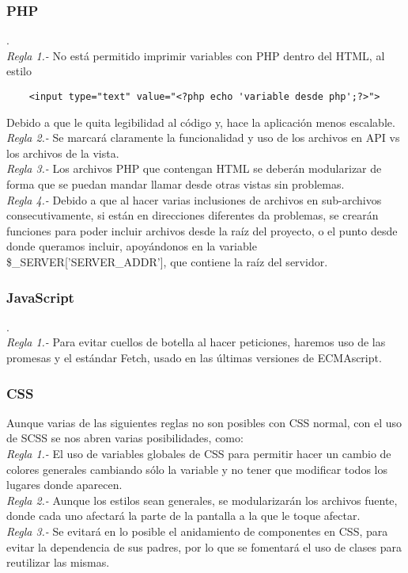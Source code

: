	\subsubsection{PHP}
	.\\
	\textit{Regla 1.-} No está permitido imprimir variables con PHP dentro del HTML, al estilo
	\begin{lstlisting}
	<input type="text" value="<?php echo 'variable desde php';?>">
	\end{lstlisting}
	Debido a que le quita legibilidad al código y, hace la aplicación menos escalable. \\
	\textit{Regla 2.-} Se marcará claramente la funcionalidad y uso de los archivos en API vs los archivos de la vista. \\
	\textit{Regla 3.-} Los archivos PHP que contengan HTML se deberán modularizar de forma que se puedan mandar llamar desde otras vistas sin problemas. \\
	\textit{Regla 4.-} Debido a que al hacer varias inclusiones de archivos en sub-archivos consecutivamente, si están en direcciones diferentes da problemas, se crearán funciones para poder incluir archivos desde la raíz del proyecto, o el punto desde donde queramos incluir, apoyándonos en la variable \$\_SERVER['SERVER\_ADDR'], que contiene la raíz del servidor.
		
	\subsubsection{JavaScript}
	.\\
	\textit{Regla 1.-} Para evitar cuellos de botella al hacer peticiones, haremos uso de las promesas y el estándar Fetch, usado en las últimas versiones de ECMAscript. \\

	\subsubsection{CSS}
	Aunque varias de las siguientes reglas no son posibles con CSS normal, con el uso de SCSS se nos abren varias posibilidades, como:\\
	\textit{Regla 1.-} El uso de variables globales de CSS para permitir hacer un cambio de colores generales cambiando sólo la variable y no tener que modificar todos los lugares donde aparecen. \\
	\textit{Regla 2.-} Aunque los estilos sean generales, se modularizarán los archivos fuente, donde cada uno afectará la parte de la pantalla a la que le toque afectar. \\
	\textit{Regla 3.-} Se evitará en lo posible el anidamiento de componentes en CSS, para evitar la dependencia de sus padres, por lo que se fomentará el uso de clases para reutilizar las mismas.
	
